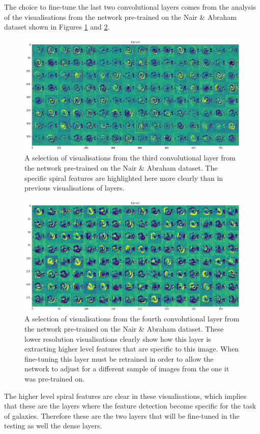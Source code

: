 \documentclass[12pt, onecolumn]{aa}
\begin{document}
The choice to fine-tune the last two convolutional layers comes from the analysis of the visualisations from the network pre-trained on the Nair \& Abraham dataset shown in Figures \ref{fig:naconv3} and \ref{fig:naconv4}.
\begin{figure}[b]
    \centering
    \includegraphics[width=0.8\linewidth,trim={3.3cm 4.5cm 4.1cm 4.5cm}, clip]{Figures/activation_layers/Conv3.png}
    \caption{A selection of visualisations from the third convolutional layer from the network pre-trained on the Nair \& Abraham dataset. The specific spiral features are highlighted here more clearly than in previous visualisations of layers.}
    \label{fig:naconv3}
\end{figure}
\begin{figure}[]
    \centering
    \includegraphics[width=.8\linewidth,trim={3.3cm 4.5cm 4.1cm 4.5cm}, clip]{Figures/activation_layers/Conv4.png}
    \caption{A selection of visualisations from the fourth convolutional layer from the network pre-trained on the Nair \& Abraham dataset. These lower resolution visualisations clearly show how this layer is extracting higher level features that are specific to this image. When fine-tuning this layer must be retrained in order to allow the network to adjust for a different sample of images from the one it was pre-trained on.}
    \label{fig:naconv4}
\end{figure}
The higher level spiral features are clear in these visualisations, which implies that these are the layers where the feature detection become specific for the task of galaxies. Therefore these are the two layers that will be fine-tuned in the testing as well the dense layers.
\end{document}

